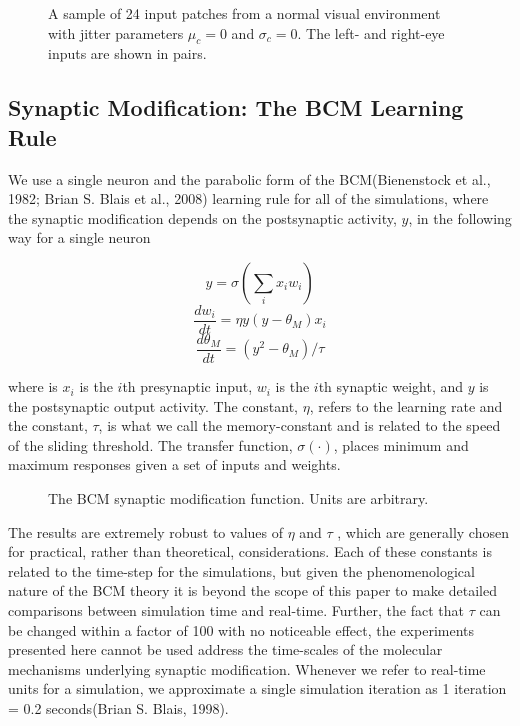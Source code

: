 \documentclass[
  onecolumn]{article}
\begin{document}
\begin{figure}
\hypertarget{fig:normal-inputs}{%
\centering

\caption{A sample of 24 input patches from a normal visual environment
with jitter parameters \(\mu_c=0\) and \(\sigma_c=0\). The left- and
right-eye inputs are shown in pairs.}\label{fig:normal-inputs}
}
\end{figure}

\hypertarget{synaptic-modification-the-bcm-learning-rule}{%
\subsection{Synaptic Modification: The BCM Learning
Rule}\label{synaptic-modification-the-bcm-learning-rule}}

We use a single neuron and the parabolic form of the BCM(Bienenstock et
al., 1982; Brian S. Blais et al., 2008) learning rule for all of the
simulations, where the synaptic modification depends on the postsynaptic
activity, \(y\), in the following way for a single neuron

\[
y=\sigma\left(\sum_i x_i w_i \right)
\] \[
\frac{dw_i}{dt} = \eta y(y-\theta_M) x_i
\] \[
\frac{d\theta_M}{dt} = (y^2-\theta_M)/\tau
\]

where is \(x_i\) is the \(i\)th presynaptic input, \(w_i\) is the
\(i\)th synaptic weight, and \(y\) is the postsynaptic output activity.
The constant, \(\eta\), refers to the learning rate and the constant,
\(\tau\), is what we call the memory-constant and is related to the
speed of the sliding threshold. The transfer function,
\(\sigma(\cdot)\), places minimum and maximum responses given a set of
inputs and weights.

\begin{figure}
\hypertarget{fig:bcm-phi}{%
\centering

\caption{The BCM synaptic modification function. Units are
arbitrary.}\label{fig:bcm-phi}
}
\end{figure}

The results are extremely robust to values of \(\eta\) and \(\tau\) ,
which are generally chosen for practical, rather than theoretical,
considerations. Each of these constants is related to the time-step for
the simulations, but given the phenomenological nature of the BCM theory
it is beyond the scope of this paper to make detailed comparisons
between simulation time and real-time. Further, the fact that \(\tau\)
can be changed within a factor of 100 with no noticeable effect, the
experiments presented here cannot be used address the time-scales of the
molecular mechanisms underlying synaptic modification. Whenever we refer
to real-time units for a simulation, we approximate a single simulation
iteration as 1 iteration = 0.2 seconds(Brian S. Blais, 1998).
\end{document}
